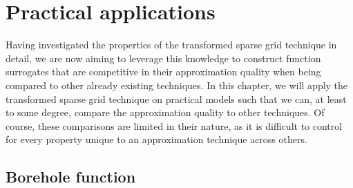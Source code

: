\documentclass[
  a4paper,  %
  twoside,  %
  bibliography=totoc,
  headsepline,
  cleardoublepage=empty,
  parskip=half,
  draft=false
]{scrbook}
\begin{document}
\chapter{Practical applications}
\label{chap:c8}

Having investigated the properties of the transformed sparse grid technique in detail, we are now aiming to leverage this knowledge to construct function surrogates that are competitive in their approximation quality when being compared to other already existing techniques.
In this chapter, we will apply the transformed sparse grid technique on practical models such that we can, at least to some degree, compare the approximation quality to other techniques.
Of course, these comparisons are limited in their nature, as it is difficult to control for every property unique to an approximation technique across others.

\section{Borehole function}
\end{document}
